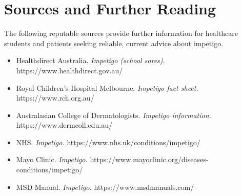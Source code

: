 \section*{Sources and Further Reading}
The following reputable sources provide further information for healthcare students and patients seeking reliable, current advice about impetigo.
\begin{itemize}
    \item Healthdirect Australia. \textit{Impetigo (school sores).} https://www.healthdirect.gov.au/
    \item Royal Children's Hospital Melbourne. \textit{Impetigo fact sheet.} https://www.rch.org.au/
    \item Australasian College of Dermatologists. \textit{Impetigo information.} https://www.dermcoll.edu.au/
    \item NHS. \textit{Impetigo.} https://www.nhs.uk/conditions/impetigo/
    \item Mayo Clinic. \textit{Impetigo.} https://www.mayoclinic.org/diseases-conditions/impetigo/
    \item MSD Manual. \textit{Impetigo.} https://www.msdmanuals.com/
\end{itemize}
